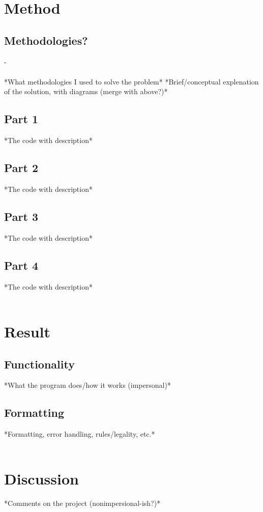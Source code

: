 \documentclass{article}
\begin{document}
	\section{Method}
		\subsection{Methodologies?}
		-
		\\ \\
		*What methodologies I used to solve the problem*
		*Brief/conceptual explenation of the solution, with diagrams (merge with above?)*
		\subsection{Part 1}
			*The code with description*
		\subsection{Part 2}
			*The code with description*
		\subsection{Part 3}
			*The code with description*
		\subsection{Part 4}
			*The code with description*
	\\ \\
	\section{Result}
		\subsection{Functionality}
			*What the program does/how it works (impersonal)*
		\subsection{Formatting}
			*Formatting, error handling, rules/legality, etc.*
	\\ \\
	\section{Discussion}
		*Comments on the project (nonimpersional-ish?)*
	
	
	\clearpage
	
	
	
\end{document}
